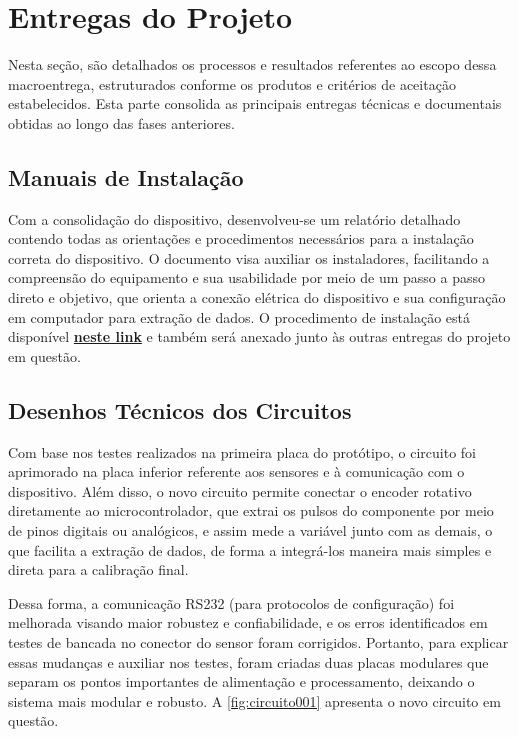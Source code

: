 \documentclass[a4paper, 12pt]{article}
\begin{document}
\newpage
\section{Entregas do Projeto}
    Nesta seção, são detalhados os processos e resultados referentes ao escopo dessa macroentrega, estruturados conforme os produtos e critérios de aceitação estabelecidos. Esta parte consolida as principais entregas técnicas e documentais obtidas ao longo das fases anteriores.

    \vspace{.15cm}
    \subsection{Manuais de Instalação}
        Com a consolidação do dispositivo, desenvolveu-se um relatório detalhado contendo todas as orientações e procedimentos necessários para a instalação correta do dispositivo. O documento visa auxiliar os instaladores, facilitando a compreensão do equipamento e sua usabilidade por meio de um passo a passo direto e objetivo, que orienta a conexão elétrica do dispositivo e sua configuração em computador para extração de dados. O procedimento de instalação está disponível \href{https://drive.google.com/file/d/14x766W_z37_zfA5v1osgzfgHE8l4T5w8/view?usp=sharing}{\textbf{neste link}} e também será anexado junto às outras entregas do projeto em questão.

    \vspace{.15cm}
    \subsection{Desenhos Técnicos dos Circuitos}
        Com base nos testes realizados na primeira placa do protótipo, o circuito foi aprimorado na placa inferior referente aos sensores e à comunicação com o dispositivo. Além disso, o novo circuito permite conectar o encoder rotativo diretamente ao microcontrolador, que extrai os pulsos do componente por meio de pinos digitais ou analógicos, e assim mede a variável junto com as demais, o que facilita a extração de dados, de forma a integrá-los maneira mais simples e direta para a calibração final. 
        
        Dessa forma, a comunicação RS232 (para protocolos de configuração) foi melhorada visando maior robustez e confiabilidade, e os erros identificados em testes de bancada no conector do sensor foram corrigidos. Portanto, para explicar essas mudanças e auxiliar nos testes, foram criadas duas placas modulares que separam os pontos importantes de alimentação e processamento, deixando o sistema mais modular e robusto. A \autoref{fig:circuito001} apresenta o novo circuito em questão.
\end{document}
